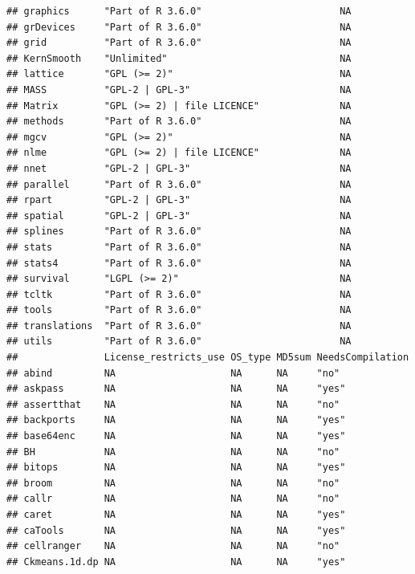 \documentclass[]{article}
\begin{document}
\begin{verbatim}
## graphics      "Part of R 3.6.0"                        NA             
## grDevices     "Part of R 3.6.0"                        NA             
## grid          "Part of R 3.6.0"                        NA             
## KernSmooth    "Unlimited"                              NA             
## lattice       "GPL (>= 2)"                             NA             
## MASS          "GPL-2 | GPL-3"                          NA             
## Matrix        "GPL (>= 2) | file LICENCE"              NA             
## methods       "Part of R 3.6.0"                        NA             
## mgcv          "GPL (>= 2)"                             NA             
## nlme          "GPL (>= 2) | file LICENCE"              NA             
## nnet          "GPL-2 | GPL-3"                          NA             
## parallel      "Part of R 3.6.0"                        NA             
## rpart         "GPL-2 | GPL-3"                          NA             
## spatial       "GPL-2 | GPL-3"                          NA             
## splines       "Part of R 3.6.0"                        NA             
## stats         "Part of R 3.6.0"                        NA             
## stats4        "Part of R 3.6.0"                        NA             
## survival      "LGPL (>= 2)"                            NA             
## tcltk         "Part of R 3.6.0"                        NA             
## tools         "Part of R 3.6.0"                        NA             
## translations  "Part of R 3.6.0"                        NA             
## utils         "Part of R 3.6.0"                        NA             
##               License_restricts_use OS_type MD5sum NeedsCompilation
## abind         NA                    NA      NA     "no"            
## askpass       NA                    NA      NA     "yes"           
## assertthat    NA                    NA      NA     "no"            
## backports     NA                    NA      NA     "yes"           
## base64enc     NA                    NA      NA     "yes"           
## BH            NA                    NA      NA     "no"            
## bitops        NA                    NA      NA     "yes"           
## broom         NA                    NA      NA     "no"            
## callr         NA                    NA      NA     "no"            
## caret         NA                    NA      NA     "yes"           
## caTools       NA                    NA      NA     "yes"           
## cellranger    NA                    NA      NA     "no"            
## Ckmeans.1d.dp NA                    NA      NA     "yes"           

\end{verbatim}
\end{document}
